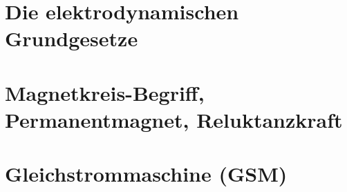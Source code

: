 \documentclass[10pt,twoside,a4paper,fleqn]{article}
\begin{document}
\setcounter{tocdepth}{2} 	%
\tableofcontents 				%
\newpage
\section{Die elektrodynamischen Grundgesetze}

\section{Magnetkreis-Begriff, Permanentmagnet, Reluktanzkraft}

\section{Gleichstrommaschine (GSM)}

\end{document}
